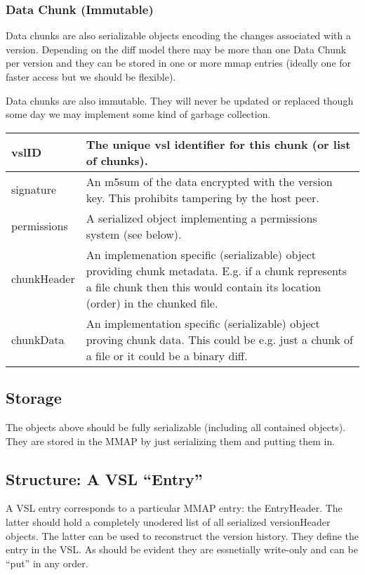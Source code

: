 \documentclass[10pt]{article}
\begin{document}
\subsubsection{Data Chunk (Immutable)}

Data chunks are also serializable objects encoding the changes associated with
a version.  Depending on the diff model there may be more than one Data Chunk
per version and they can be stored in one or more mmap entries (ideally one for
faster access but we should be flexible).

Data chunks are also immutable.  They will never be updated or replaced though
some day we may implement some kind of garbage collection.


\begin{tabular}{|l|p{12cm}|}
\hline
vslID & The unique vsl identifier for this chunk (or list of chunks).\\
\hline
signature & An m5sum of the data encrypted with the version key.  This prohibits tampering by the host peer.\\
\hline
permissions & A serialized object implementing a permissions system (see below).\\
\hline
chunkHeader & An implemenation specific (serializable) object providing chunk metadata.  E.g. if a chunk represents a file chunk then this would contain its location (order) in the chunked file.\\
\hline
chunkData & An implementation specific (serializable) object proving chunk data.  This could be e.g. just a chunk of a file or it could be a binary diff.\\
\hline
\end{tabular}


\subsection{Storage}

The objects above should be fully serializable (including all contained objects).  They are stored in the MMAP by just serializing them and putting them in.



\subsection{Structure: A VSL ``Entry''}

A VSL entry corresponds to a particular MMAP entry: the EntryHeader.  The latter
should hold a completely unodered list of all serialized versionHeader objects.
The latter can be used to reconstruct the version history.  They define the
entry in the VSL.  As should be evident they are essnetially write-only and can
be ``put'' in any order.  
\end{document}
